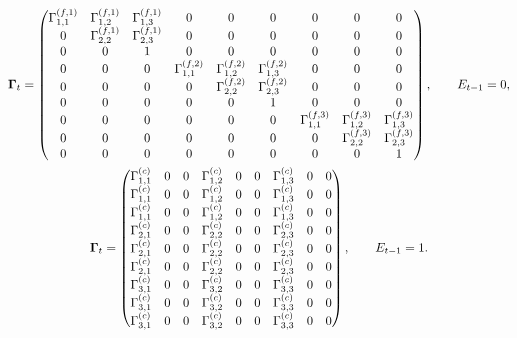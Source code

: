 \documentclass[12pt]{article}
\begin{document}
\begin{gather*}
    \boldsymbol{\Gamma}_t = 
    \begin{pmatrix}
        \Gamma_{1,1}^{(f,1)} & \Gamma_{1,2}^{(f,1)} & \Gamma_{1,3}^{(f,1)} & 0 & 0 & 0 & 0 & 0 & 0 \\
        0 & \Gamma_{2,2}^{(f,1)} & \Gamma_{2,3}^{(f,1)} & 0 & 0 & 0 & 0 & 0 & 0 \\
        0 & 0 & 1 & 0 & 0 & 0 & 0 & 0 & 0 \\
        0 & 0 & 0 & \Gamma_{1,1}^{(f,2)} & \Gamma_{1,2}^{(f,2)} & \Gamma_{1,3}^{(f,2)} & 0 & 0 & 0 \\
        0 & 0 & 0 & 0 & \Gamma_{2,2}^{(f,2)} & \Gamma_{2,3}^{(f,2)} & 0 & 0 & 0 \\
        0 & 0 & 0 & 0 & 0 & 1 & 0 & 0 & 0 \\
        0 & 0 & 0 & 0 & 0 & 0 & \Gamma_{1,1}^{(f,3)} & \Gamma_{1,2}^{(f,3)} & \Gamma_{1,3}^{(f,3)} \\
        0 & 0 & 0 & 0 & 0 & 0 & 0 & \Gamma_{2,2}^{(f,3)} & \Gamma_{2,3}^{(f,3)} \\
        0 & 0 & 0 & 0 & 0 & 0 & 0 & 0 & 1 \\
    \end{pmatrix}, \qquad E_{t-1} = 0,  \\
    \boldsymbol{\Gamma}_t = 
    \begin{pmatrix}
        \Gamma_{1,1}^{(c)} & 0 & 0 & \Gamma_{1,2}^{(c)} & 0 & 0 & \Gamma_{1,3}^{(c)} & 0 & 0 \\
        \Gamma_{1,1}^{(c)} & 0 & 0 & \Gamma_{1,2}^{(c)} & 0 & 0 & \Gamma_{1,3}^{(c)} & 0 & 0 \\
        \Gamma_{1,1}^{(c)} & 0 & 0 & \Gamma_{1,2}^{(c)} & 0 & 0 & \Gamma_{1,3}^{(c)} & 0 & 0 \\
        \Gamma_{2,1}^{(c)} & 0 & 0 & \Gamma_{2,2}^{(c)} & 0 & 0 & \Gamma_{2,3}^{(c)} & 0 & 0 \\
        \Gamma_{2,1}^{(c)} & 0 & 0 & \Gamma_{2,2}^{(c)} & 0 & 0 & \Gamma_{2,3}^{(c)} & 0 & 0 \\
        \Gamma_{2,1}^{(c)} & 0 & 0 & \Gamma_{2,2}^{(c)} & 0 & 0 & \Gamma_{2,3}^{(c)} & 0 & 0 \\
        \Gamma_{3,1}^{(c)} & 0 & 0 & \Gamma_{3,2}^{(c)} & 0 & 0 & \Gamma_{3,3}^{(c)} & 0 & 0 \\
        \Gamma_{3,1}^{(c)} & 0 & 0 & \Gamma_{3,2}^{(c)} & 0 & 0 & \Gamma_{3,3}^{(c)} & 0 & 0 \\
        \Gamma_{3,1}^{(c)} & 0 & 0 & \Gamma_{3,2}^{(c)} & 0 & 0 & \Gamma_{3,3}^{(c)} & 0 & 0 \\
    \end{pmatrix}, \qquad E_{t-1} = 1.  \\
\end{gather*}
\end{document}
